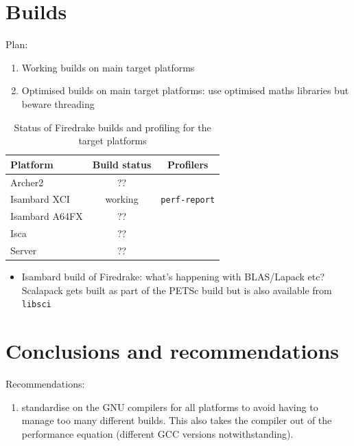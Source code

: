 \documentclass[a4paper,titlepage]{article}
\begin{document}

\section{Builds}

Plan:
\begin{enumerate}
\item Working builds on main target platforms
\item Optimised builds on main target platforms: use optimised maths libraries but beware threading
\end{enumerate}
%

\begin{table}[htp]
\begin{center}
\begin{tabular}{|l|c|c|}
\hline
Platform       &  Build status   & Profilers           \\
\hline
Archer2        &  ??             & \\
Isambard XCI   &  working        & \texttt{perf-report} \\
Isambard A64FX &  ??             & \\
Isca           &  ??             & \\
Server         &  ??             & \\
\hline
\end{tabular}
\end{center}
\caption{Status of Firedrake builds and profiling for the target platforms}
\label{table:build_status}
\end{table}%

\begin{itemize}
\item Isambard build of Firedrake: what's happening with BLAS/Lapack etc? Scalapack gets built as part of the PETSc build but is also available from \texttt{libsci}
\end{itemize}



\section{Conclusions and recommendations}

Recommendations:
\begin{enumerate}
\item standardise on the GNU compilers for all platforms to avoid having to manage too many different builds. This also takes the compiler out of the performance equation (different GCC versions notwithstanding).
\end{enumerate}

\end{document}

